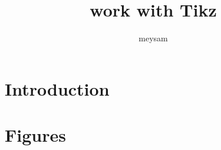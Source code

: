 \documentclass[a4paper, twocolumn]{article}
\title{work with Tikz}
\author{meysam}
\begin{document}
	\maketitle	
	
	\begin{abstract}
		\lipsum[1]
	\end{abstract}
	
	\tableofcontents
	
	\section{Introduction}
	\lipsum[1-5]
	
	\section{Figures}\label{sect:figures}
	\lipsum[1-3]
	
	
	
\end{document}
